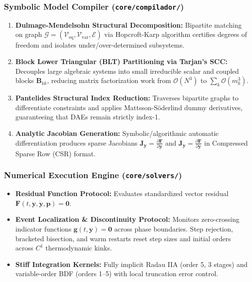 \documentclass[11pt,a4paper]{article}
\begin{document}
\subsubsection{Symbolic Model Compiler (\texttt{core/compilador/})}
\begin{enumerate}[leftmargin=*]
    \item \textbf{Dulmage-Mendelsohn Structural Decomposition:} Bipartite matching on graph $\mathcal{G} = (\mathcal{V}_{\text{eq}}, \mathcal{V}_{\text{var}}, \mathcal{E})$ via Hopcroft-Karp algorithm certifies degrees of freedom and isolates under/over-determined subsystems.
    \item \textbf{Block Lower Triangular (BLT) Partitioning via Tarjan's SCC:} Decouples large algebraic systems into small irreducible scalar and coupled blocks $\mathbf{B}_{kk}$, reducing matrix factorization work from $\mathcal{O}(N^3)$ to $\sum_k \mathcal{O}(m_k^3)$.
    \item \textbf{Pantelides Structural Index Reduction:} Traverses bipartite graphs to differentiate constraints and applies Mattsson-S\"oderlind dummy derivatives, guaranteeing that DAEs remain strictly index-1.
    \item \textbf{Analytic Jacobian Generation:} Symbolic/algorithmic automatic differentiation produces sparse Jacobians $\mathbf{J}_{\mathbf{y}} = \frac{\partial \mathbf{F}}{\partial \mathbf{y}}$ and $\mathbf{J}_{\dot{\mathbf{y}}} = \frac{\partial \mathbf{F}}{\partial \dot{\mathbf{y}}}$ in Compressed Sparse Row (CSR) format.
\end{enumerate}

\subsubsection{Numerical Execution Engine (\texttt{core/solvers/})}
\begin{itemize}[leftmargin=*]
    \item \textbf{Residual Function Protocol:} Evaluates standardized vector residual $\mathbf{F}(t, \mathbf{y}, \dot{\mathbf{y}}, \mathbf{p}) = \mathbf{0}$.
    \item \textbf{Event Localization & Discontinuity Protocol:} Monitors zero-crossing indicator functions $\mathbf{g}(t, \mathbf{y}) = \mathbf{0}$ across phase boundaries. Step rejection, bracketed bisection, and warm restarts reset step sizes and initial orders across $C^1$ thermodynamic kinks.
    \item \textbf{Stiff Integration Kernels:} Fully implicit Radau IIA (order 5, 3 stages) and variable-order BDF (orders 1--5) with local truncation error control.
\end{itemize}
\end{document}
